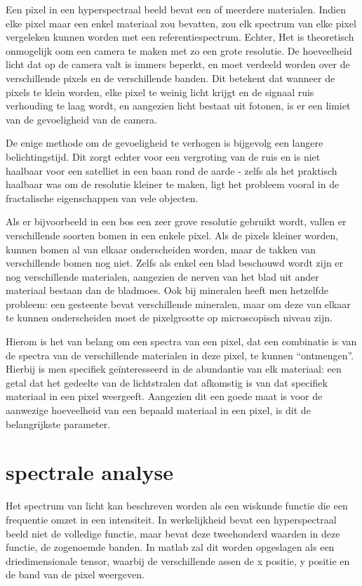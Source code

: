 \documentclass[12pt]{report}
\begin{document}
Een pixel in een hyperspectraal beeld bevat een of meerdere materialen. Indien elke pixel maar een enkel materiaal zou bevatten, zou elk spectrum van elke pixel vergeleken kunnen worden met een referentiespectrum. Echter, Het is theoretisch onmogelijk oom een camera te maken met zo een grote resolutie. De hoeveelheid licht dat op de camera valt is immers beperkt, en moet verdeeld worden over de verschillende pixels en de verschillende banden. Dit betekent dat wanneer de pixels te klein worden, elke pixel te weinig licht krijgt en de signaal ruis verhouding te laag wordt, en aangezien licht bestaat uit fotonen, is er een limiet van de gevoeligheid van de camera. 

De enige methode om de gevoeligheid te verhogen is bijgevolg een langere belichtingstijd. Dit zorgt echter voor een vergroting van de ruis en is niet haalbaar voor een satelliet in een baan rond de aarde - zelfs als het praktisch haalbaar was om de resolutie kleiner te maken, ligt het probleem vooral in de fractalische eigenschappen van vele objecten. 

Als er bijvoorbeeld in een bos een zeer grove resolutie gebruikt wordt, vallen er verschillende soorten bomen in een enkele pixel. Als de pixels kleiner worden, kunnen bomen al van elkaar onderscheiden worden, maar de takken van verschillende bomen nog niet. Zelfs als enkel een blad beschouwd wordt zijn er nog verschillende materialen, aangezien de nerven van het blad uit ander materiaal bestaan dan de bladmoes. Ook bij mineralen heeft men hetzelfde probleem: een gesteente bevat verschillende mineralen, maar om deze van elkaar te kunnen onderscheiden moet de pixelgrootte op microscopisch niveau zijn. 

Hierom is het van belang om een spectra van een pixel, dat een combinatie is van de spectra van de verschillende materialen in deze pixel, te kunnen ``ontmengen''. Hierbij is men specifiek ge\"interesseerd in de abundantie van elk materiaal: een getal dat het gedeelte van de lichtstralen dat afkomstig is van dat specifiek materiaal in een pixel weergeeft. Aangezien dit een goede maat is voor de aanwezige hoeveelheid van een bepaald materiaal in een pixel, is dit de belangrijkste parameter.

\section{spectrale analyse}


Het spectrum van licht kan beschreven worden als een wiskunde functie die een frequentie omzet in een intensiteit. In werkelijkheid bevat een hyperspectraal beeld niet de volledige functie, maar bevat deze tweehonderd waarden in deze functie, de zogenoemde banden. In matlab\citep{MATLAB} zal dit worden opgeslagen als een driedimensionale tensor, waarbij de verschillende assen de x positie, y positie en de band van de pixel weergeven. 
\end{document}
